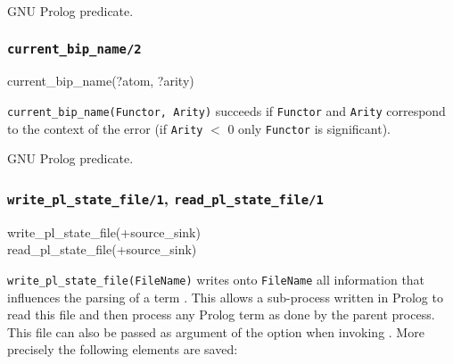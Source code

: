\Portability

GNU Prolog predicate.

\subsubsection{\texttt{current\_bip\_name/2}}
\label{current-bip-name/2}

\begin{TemplatesOneCol}
current\_bip\_name(?atom, ?arity)

\end{TemplatesOneCol}

\Description

\texttt{current\_bip\_name(Functor, Arity)} succeeds if \texttt{Functor} and
\texttt{Arity} correspond to the context of the error  (if \texttt{Arity} $<$ 0 only \texttt{Functor} is
significant).

\begin{PlErrors}



\end{PlErrors}

\Portability

GNU Prolog predicate.

\subsubsection{\texttt{write\_pl\_state\_file/1},
               \texttt{read\_pl\_state\_file/1}}
\label{write-pl-state-file/1}

\begin{TemplatesOneCol}
write\_pl\_state\_file(+source\_sink)\\
read\_pl\_state\_file(+source\_sink)

\end{TemplatesOneCol}

\Description

\texttt{write\_pl\_state\_file(FileName)} writes onto \texttt{FileName} all
information that influences the parsing of a term . This allows a sub-process written in Prolog to read this
file and then process any Prolog term as done by the parent process. This
file can also be passed as argument of the  option when
invoking  . More precisely the
following elements are saved:

